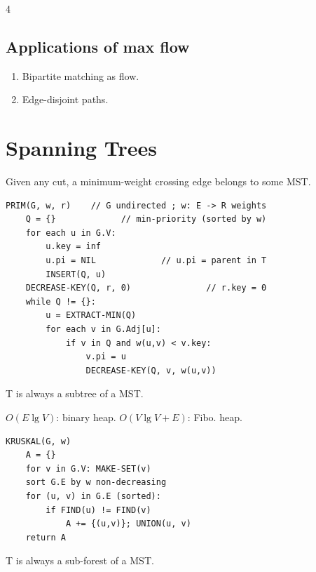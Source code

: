 \documentclass[8pt,a4paper,landscape]{extarticle}
\begin{document}
\begin{multicols*}{4}
\subsection{Applications of max flow}
\begin{enumerate}
  \item Bipartite matching as flow.
  \item Edge-disjoint paths.
\end{enumerate}

\section{Spanning Trees}

\begin{thm}[title=Cut property (safe edge)]
Given any cut, a minimum-weight crossing edge belongs to some MST.
\end{thm}

\begin{lstlisting}
PRIM(G, w, r)    // G undirected ; w: E -> R weights
    Q = {}             // min-priority (sorted by w)
    for each u in G.V:
        u.key = inf
        u.pi = NIL             // u.pi = parent in T
        INSERT(Q, u)
    DECREASE-KEY(Q, r, 0)               // r.key = 0
    while Q != {}:
        u = EXTRACT-MIN(Q)
        for each v in G.Adj[u]:
            if v in Q and w(u,v) < v.key:
                v.pi = u
                DECREASE-KEY(Q, v, w(u,v))
\end{lstlisting}

\begin{thm}[title=Why does it work?]
T is always a subtree of a MST.
\end{thm}

\begin{prop}[title=Prim's runtime]
$O(E\lg V)$: binary heap. $O(V\lg V+E)$: Fibo. heap.
\end{prop}

\begin{lstlisting}
KRUSKAL(G, w)
    A = {}
    for v in G.V: MAKE-SET(v)
    sort G.E by w non-decreasing
    for (u, v) in G.E (sorted):
        if FIND(u) != FIND(v)
            A += {(u,v)}; UNION(u, v)
    return A
\end{lstlisting}

\begin{thm}[title=Why does it work?]
T is always a sub-forest of a MST.
\end{thm}


\end{multicols*}
\end{document}
